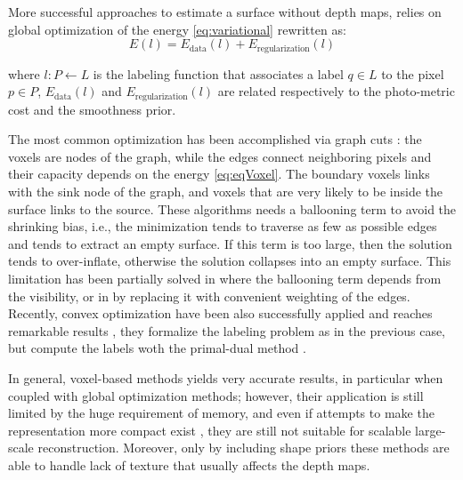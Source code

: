 More successful approaches to estimate a surface without depth maps, relies on global optimization of the energy \eqref{eq:variational} rewritten as:
\begin{equation}
\label{eq:eqVoxel}
E(\mathit{l}) = E_{\text{data}}(\mathit{l}) + E_{\text{regularization}} (\mathit{l})  
\end{equation}


where $\mathit{l}:\mathit{P}\leftarrow \mathit{L}$ is the labeling function that associates a label $q\in \mathit{L}$ to the pixel $p \in\mathit{P}$, $E_{\text{data}}(\mathit{l})$ and $E_{\text{regularization}} (\mathit{l})$ are related respectively to the photo-metric cost and the smoothness prior.

The most common optimization has been accomplished via graph cuts \cite{vogiatzis2005multi,kolmogorov2002multi,hornung2006hierarchical,furukawa2006carved,mucke2011surface,hernandez2007probabilistic}: the voxels are nodes of the graph, while the edges connect neighboring pixels and their capacity depends on the energy \eqref{eq:eqVoxel}. The boundary voxels links with the sink node of the graph, and voxels that are very likely to be inside the surface links to the source.
These algorithms needs a ballooning term to avoid the shrinking bias, i.e., the minimization tends to traverse as few as possible edges and tends to extract an empty surface. If this term is too large, then the solution tends to over-inflate, otherwise the solution collapses into an empty surface.
This limitation has been partially solved in \cite{hernandez2007probabilistic} where the ballooning term depends  from the visibility, or in \cite{mucke2011surface} by replacing it with convenient weighting of the edges. 
Recently, convex optimization have been also successfully applied and reaches remarkable results
\cite{kolev2009continuous,kolev2010anisotropic,kostrikov2014probabilistic}, they formalize the labeling problem as in the previous case, but compute the labels woth the primal-dual method \cite{mehrotra1992implementation}.




In general, voxel-based methods yields very accurate results, in particular when coupled with global optimization methods; however, their application is still limited by the huge requirement of memory, and even if attempts to make the representation more compact exist \cite{steinbrucker2014volumetric,chen2013scalable,zeng2013octree}, they are still not suitable for scalable large-scale reconstruction.
Moreover, only by including shape priors these methods are able to handle lack of texture \cite{karimi2015segment} that usually affects the depth maps.


